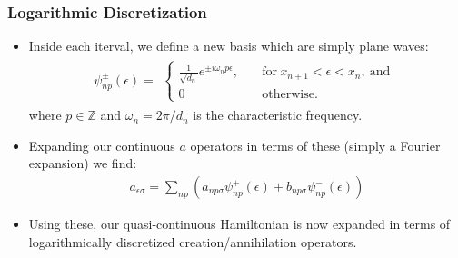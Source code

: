 \documentclass{beamer}
\begin{document}
\begin{frame}
  \frametitle{Logarithmic Discretization}

  \begin{itemize}
  \item Inside each iterval, we define a new basis which are simply plane waves:
    \begin{gather*}
      \psi^{\pm}_{np}(\epsilon) =
      \begin{alignedat}{1}
        \begin{cases}
          \frac{1}{\sqrt{d_n}}e^{\pm i\omega_n p\epsilon}, \quad & \text{for}\ x_{n+1} < \epsilon < x_n,\ \text{and} \\
          0 & \text{otherwise}.
        \end{cases}
      \end{alignedat}
    \end{gather*}
    where $p \in \mathbb{Z}$ and $\omega_n = 2\pi/d_n$ is the characteristic frequency.
  \item Expanding our continuous $a$ operators in terms of these (simply a Fourier expansion) we find:
    \begin{gather*}
      a_{\epsilon\sigma} = \sum_{np} (a_{np\sigma}\psi^+_{np}(\epsilon) + b_{np\sigma}\psi^-_{np}(\epsilon))
    \end{gather*}
  \item Using these, our quasi-continuous Hamiltonian is now expanded in terms of logarithmically discretized creation/annihilation operators.
  \end{itemize}
\end{frame}
\end{document}
